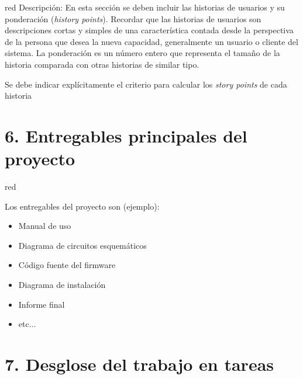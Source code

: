 \documentclass[
11pt, %
]{charter}
\begin{document}
\begin{consigna}{red}
Descripción: En esta sección se deben incluir las historias de usuarios y su ponderación (\textit{history points}). Recordar que las historias de usuarios son descripciones cortas y simples de una característica contada desde la perspectiva de la persona que desea la nueva capacidad, generalmente un usuario o cliente del sistema. La ponderación es un número entero que representa el tamaño de la historia comparada con otras historias de similar tipo.

Se debe indicar explícitamente el criterio para calcular los \textit{story points} de cada historia
\end{consigna}

\section{6. Entregables principales del proyecto}
\label{sec:entregables}

\begin{consigna}{red}

Los entregables del proyecto son (ejemplo):

\begin{itemize}
	\item Manual de uso
	\item Diagrama de circuitos esquemáticos
	\item Código fuente del firmware
	\item Diagrama de instalación
	\item Informe final
	\item etc...
\end{itemize}

\end{consigna}

\section{7. Desglose del trabajo en tareas}
\label{sec:wbs}
\end{document}
